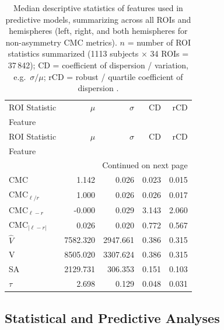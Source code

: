\documentclass{article}
\begin{document}
\begin{longtable}{lrrrr}
	\caption{Median descriptive statistics of features used in predictive models, summarizing across all ROIs and hemispheres (left, right, and both hemispheres for non-asymmetry CMC metrics). \(n\) = number of ROI statistics summarized (1113 subjects \(\times\) 34 ROIs = 37\,842); CD = coefficient of dispersion / variation, e.g.\ \(\sigma / \mu\); rCD = robust / quartile coefficient of dispersion \citep{bonettConfidenceIntervalCoefficient2006}.} \label{tab:pred-feature-stats} \\
	\toprule
	ROI Statistic & $\mu$ & $\sigma$ & CD & rCD \\
	Feature &  &  &  &  \\
	\midrule
	\endfirsthead
	\toprule
	ROI Statistic & $\mu$ & $\sigma$ & CD & rCD \\
	Feature &  &  &  &  \\
	\midrule
	\endhead
	\midrule
	\multicolumn{5}{r}{Continued on next page} \\
	\midrule
	\endfoot
	\bottomrule
	\endlastfoot
	$\text{CMC}$ & 1.142 & 0.026 & 0.023 & 0.015 \\
	$\text{CMC}_{\ell / r}$ & 1.000 & 0.026 & 0.026 & 0.017 \\
	$\text{CMC}_{\ell - r}$ & -0.000 & 0.029 & 3.143 & 2.060 \\
	$\text{CMC}_{|\ell - r|}$ & 0.026 & 0.020 & 0.772 & 0.567 \\
	$\hat{V}$ & 7582.320 & 2947.661 & 0.386 & 0.315 \\
	V & 8505.020 & 3307.624 & 0.386 & 0.315 \\
	SA & 2129.731 & 306.353 & 0.151 & 0.103 \\
	$\tau$ & 2.698 & 0.129 & 0.048 & 0.031 \\
	\end{longtable}

\subsection{Statistical and Predictive Analyses}
\end{document}
